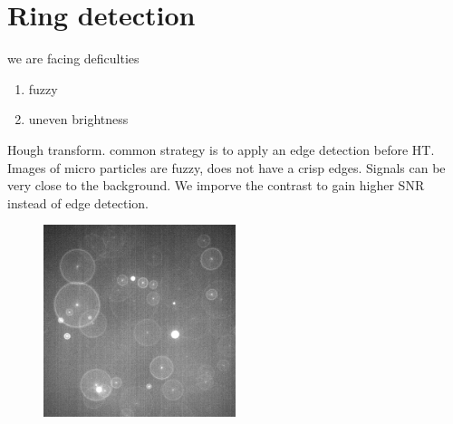 \section{Ring detection}

we are facing deficulties
\begin{enumerate}
\item fuzzy 
\item uneven brightness
\end{enumerate}

Hough transform.
common strategy is to apply an edge detection before HT.
Images of micro particles are fuzzy, does not have a crisp edges. 
Signals can be very close to the background.
We imporve the contrast to gain higher SNR instead of edge detection.

\begin{figure}
\centering
\includegraphics[width=0.5\textwidth]{figs/img0-auto.png}
\end{figure}
